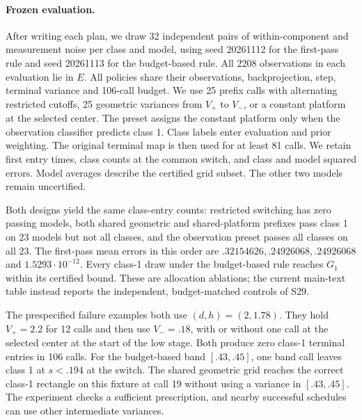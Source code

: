 \paragraph{Frozen evaluation.}
After writing each plan, we draw 32 independent pairs of
within-component and measurement noise per class and model,
using seed 20261112 for the first-pass rule and seed
20261113 for the budget-based rule. All 2208 observations
in each evaluation lie in $E$. All policies share their
observations, backprojection, step, terminal variance and
106-call budget. We use 25 prefix calls with alternating
restricted cutoffs, 25 geometric variances from $V_+$ to
$V_-$, or a constant platform at the selected center.
The preset assigns the constant platform only when the
observation classifier predicts class 1. Class labels enter
evaluation and prior weighting. The original terminal map
is then used for at least 81 calls. We retain first entry
times, class counts at the common switch, and class and model
squared errors. Model averages describe the certified grid
subset. The other two models remain uncertified.

Both designs yield the same class-entry counts: restricted
switching has zero passing models, both shared geometric and
shared-platform prefixes pass class 1 on 23 models but not all
classes, and the observation preset passes all classes on all 23.
The first-pass mean errors in this order are
$.32154626,.24926068,.24926068$ and $1.5293\cdot10^{-12}$.
Every class-1 draw under the budget-based rule reaches $G_1$
within its certified bound. These are allocation ablations;
the current main-text table instead reports the independent,
budget-matched controls of S29.

The prespecified failure examples both use $(d,h)=(2,1.78)$.
They hold $V_+=2.2$ for 12 calls and then use $V_-=.18$,
with or without one call at the selected center at the start
of the low stage. Both produce zero class-1 terminal entries
in 106 calls. For the budget-based band $[.43,.45]$, one band
call leaves class 1 at $s<.194$ at the switch. The shared
geometric grid reaches the correct class-1 rectangle on this
fixture at call 19 without using a variance in $[.43,.45]$.
The experiment checks a sufficient prescription, and nearby
successful schedules can use other intermediate variances.

